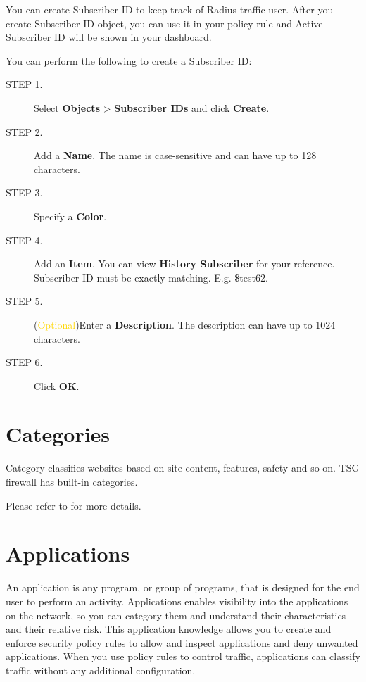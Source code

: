 You can create Subscriber ID to keep track of Radius traffic user. After you create Subscriber ID object, you can use it in your policy rule and Active Subscriber ID will be shown in your dashboard. 


You can perform the following to create a Subscriber ID:

\begin{description}
    \item[STEP 1.]	Select \textbf{Objects} > \textbf{Subscriber IDs} and click \textbf{Create}.
    \item[STEP 2.]	Add a \textbf{Name}. The name is case-sensitive and can have up to 128 characters.
    \item[STEP 3.]	Specify a \textbf{Color}.
    \item[STEP 4.]	Add an \textbf{Item}. You can view \textbf{History Subscriber} for your reference. Subscriber ID must be exactly matching. E.g. \$test62.
    \item[STEP 5.]	(\textcolor{gold}{Optional})Enter a \textbf{Description}. The description can have up to 1024 characters.
    \item[STEP 6.]	Click \textbf{OK}.
\end{description}

\section*{\hypertarget{link:Categories}{Categories}}
\label{sec:objects:category}

Category classifies websites based on site content, features, safety and so on. TSG firewall has built-in categories.


Please refer to \hyperlink{link:Appendix A Built-in Category}{\color{linkblue}{Appendix A Built-in Category}} for more details.

\section*{\hypertarget{link:Applications}{Applications}}
\label{sec:objects:application}

An application is any program, or group of programs, that is designed for the end user to perform an activity. Applications enables visibility into the applications on the network, so you can category them and understand their characteristics and their relative risk. This application knowledge allows you to create and enforce security policy rules to allow and inspect applications and deny unwanted applications. When you use policy rules to control traffic, applications can classify traffic without any additional configuration.



